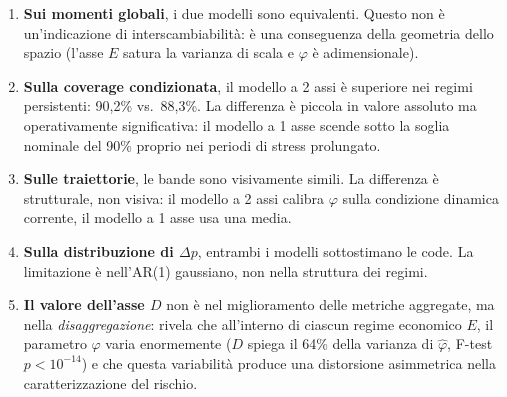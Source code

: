 \documentclass[12pt]{article}
\begin{document}
\begin{enumerate}
\item \textbf{Sui momenti globali}, i due modelli sono equivalenti. Questo non è un'indicazione di interscambiabilità: è una conseguenza della geometria dello spazio (l'asse $E$ satura la varianza di scala e $\varphi$ è adimensionale).

\item \textbf{Sulla coverage condizionata}, il modello a 2 assi è superiore nei regimi persistenti: 90,2\% vs.\ 88,3\%. La differenza è piccola in valore assoluto ma operativamente significativa: il modello a 1 asse scende sotto la soglia nominale del 90\% proprio nei periodi di stress prolungato.

\item \textbf{Sulle traiettorie}, le bande sono visivamente simili. La differenza è strutturale, non visiva: il modello a 2 assi calibra $\varphi$ sulla condizione dinamica corrente, il modello a 1 asse usa una media.

\item \textbf{Sulla distribuzione di $\Delta p$}, entrambi i modelli sottostimano le code. La limitazione è nell'AR(1) gaussiano, non nella struttura dei regimi.

\item \textbf{Il valore dell'asse $D$} non è nel miglioramento delle metriche aggregate, ma nella \emph{disaggregazione}: rivela che all'interno di ciascun regime economico $E$, il parametro $\varphi$ varia enormemente ($D$ spiega il 64\% della varianza di $\hat{\varphi}$, F-test $p < 10^{-14}$) e che questa variabilità produce una distorsione asimmetrica nella caratterizzazione del rischio.
\end{enumerate}
\end{document}
